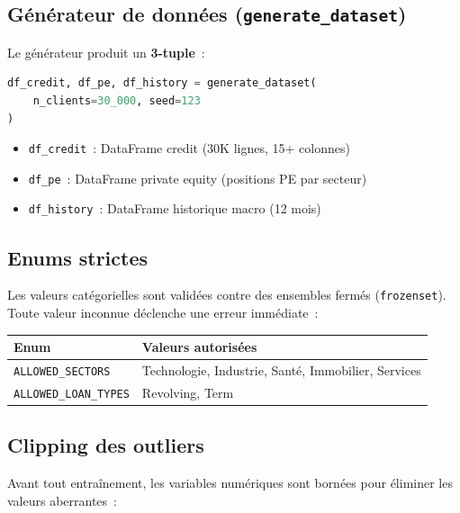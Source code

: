 \documentclass[12pt,a4paper]{article}
\begin{document}
\subsection{G\'en\'erateur de donn\'ees (\texttt{generate\_dataset})}

Le g\'en\'erateur produit un \textbf{3-tuple}~:

\begin{definitionbox}
\begin{lstlisting}[language=Python]
df_credit, df_pe, df_history = generate_dataset(
    n_clients=30_000, seed=123
)
\end{lstlisting}
\begin{itemize}[noitemsep]
    \item \texttt{df\_credit}~: DataFrame credit (30K lignes, 15+ colonnes)
    \item \texttt{df\_pe}~: DataFrame private equity (positions PE par secteur)
    \item \texttt{df\_history}~: DataFrame historique macro (12 mois)
\end{itemize}
\end{definitionbox}

\subsection{Enums strictes}

Les valeurs cat\'egorielles sont valid\'ees contre des ensembles ferm\'es (\texttt{frozenset}). Toute valeur inconnue d\'eclenche une erreur imm\'ediate~:

\begin{center}
\begin{tabular}{lp{8cm}}
\toprule
\textbf{Enum} & \textbf{Valeurs autoris\'ees} \\
\midrule
\texttt{ALLOWED\_SECTORS} & Technologie, Industrie, Sant\'e, Immobilier, Services \\
\texttt{ALLOWED\_LOAN\_TYPES} & Revolving, Term \\
\bottomrule
\end{tabular}
\end{center}

\subsection{Clipping des outliers}

Avant tout entra\^inement, les variables num\'eriques sont born\'ees pour \'eliminer les valeurs aberrantes~:
\end{document}
